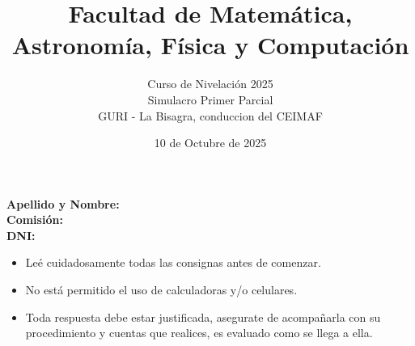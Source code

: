 \documentclass[a4paper]{article}
\title{Facultad de Matemática, Astronomía, Física y Computación}
\author{Curso de Nivelación 2025\\Simulacro Primer Parcial\\ GURI - La Bisagra, conduccion del CEIMAF}
\date{10 de Octubre de 2025}
\begin{document}
\maketitle
\noindent\textbf{Apellido y Nombre:}\\
\textbf{Comisión:}\\
\textbf{DNI:}
\begin{itemize}
        \item Leé cuidadosamente todas las consignas antes de comenzar.
        \item No está permitido el uso de calculadoras y/o celulares.
        \item Toda respuesta debe estar justificada, asegurate de acompañarla con su procedimiento y cuentas que realices, es evaluado como se llega a ella.
\end{itemize}
\end{document}
